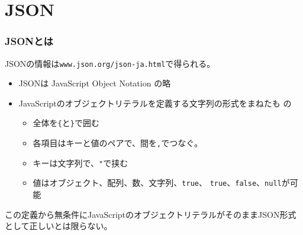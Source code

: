 

\frame{\maketitle}
\section{JSON}
\begin{frame}[containsverbatim]
 \frametitle{JSONとは}
 JSONの情報は\texttt{www.json.org/json-ja.html}で得られる。
 \begin{itemize}
  \item  JSONは JavaScript Object Notation の略
  \item JavaScriptのオブジェクトリテラルを定義する文字列の形式をまねたも
				の
				\begin{itemize}
				 \item 全体を\texttt{\{}と\texttt{\}}で囲む
				 \item 各項目はキーと値のペアで、間を\texttt{,}でつなぐ。
				 \item キーは文字列で、\texttt{"}で挟む%
				 \item 値はオブジェクト、配列、数、文字列、\texttt{true}、
							 \texttt{true}、\texttt{false}、\texttt{null}が可能
				\end{itemize}
 \end{itemize}
 この定義から無条件にJavaScriptのオブジェクトリテラルがそのままJSON形式
 として正しいとは限らない。
\end{frame}
\begin{frame}[containsverbatim]
 \frametitle{}
\end{frame}

\begin{frame}[containsverbatim]
\frametitle{}
\end{frame}
